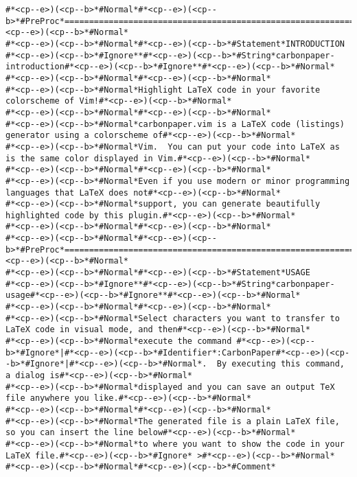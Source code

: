 \begin{lstlisting}[style=carbonpaper]
#*<cp--e>)(<cp--b>*#Normal*#*<cp--e>)(<cp--b>*#PreProc*==============================================================================#*<cp--e>)(<cp--b>*#Normal*
#*<cp--e>)(<cp--b>*#Normal*#*<cp--e>)(<cp--b>*#Statement*INTRODUCTION                                        #*<cp--e>)(<cp--b>*#Ignore**#*<cp--e>)(<cp--b>*#String*carbonpaper-introduction#*<cp--e>)(<cp--b>*#Ignore**#*<cp--e>)(<cp--b>*#Normal*
#*<cp--e>)(<cp--b>*#Normal*#*<cp--e>)(<cp--b>*#Normal*
#*<cp--e>)(<cp--b>*#Normal*Highlight LaTeX code in your favorite colorscheme of Vim!#*<cp--e>)(<cp--b>*#Normal*
#*<cp--e>)(<cp--b>*#Normal*#*<cp--e>)(<cp--b>*#Normal*
#*<cp--e>)(<cp--b>*#Normal*carbonpaper.vim is a LaTeX code (listings) generator using a colorscheme of#*<cp--e>)(<cp--b>*#Normal*
#*<cp--e>)(<cp--b>*#Normal*Vim.  You can put your code into LaTeX as is the same color displayed in Vim.#*<cp--e>)(<cp--b>*#Normal*
#*<cp--e>)(<cp--b>*#Normal*#*<cp--e>)(<cp--b>*#Normal*
#*<cp--e>)(<cp--b>*#Normal*Even if you use modern or minor programming languages that LaTeX does not#*<cp--e>)(<cp--b>*#Normal*
#*<cp--e>)(<cp--b>*#Normal*support, you can generate beautifully highlighted code by this plugin.#*<cp--e>)(<cp--b>*#Normal*
#*<cp--e>)(<cp--b>*#Normal*#*<cp--e>)(<cp--b>*#Normal*
#*<cp--e>)(<cp--b>*#Normal*#*<cp--e>)(<cp--b>*#PreProc*==============================================================================#*<cp--e>)(<cp--b>*#Normal*
#*<cp--e>)(<cp--b>*#Normal*#*<cp--e>)(<cp--b>*#Statement*USAGE                                                      #*<cp--e>)(<cp--b>*#Ignore**#*<cp--e>)(<cp--b>*#String*carbonpaper-usage#*<cp--e>)(<cp--b>*#Ignore**#*<cp--e>)(<cp--b>*#Normal*
#*<cp--e>)(<cp--b>*#Normal*#*<cp--e>)(<cp--b>*#Normal*
#*<cp--e>)(<cp--b>*#Normal*Select characters you want to transfer to LaTeX code in visual mode, and then#*<cp--e>)(<cp--b>*#Normal*
#*<cp--e>)(<cp--b>*#Normal*execute the command #*<cp--e>)(<cp--b>*#Ignore*|#*<cp--e>)(<cp--b>*#Identifier*:CarbonPaper#*<cp--e>)(<cp--b>*#Ignore*|#*<cp--e>)(<cp--b>*#Normal*.  By executing this command, a dialog is#*<cp--e>)(<cp--b>*#Normal*
#*<cp--e>)(<cp--b>*#Normal*displayed and you can save an output TeX file anywhere you like.#*<cp--e>)(<cp--b>*#Normal*
#*<cp--e>)(<cp--b>*#Normal*#*<cp--e>)(<cp--b>*#Normal*
#*<cp--e>)(<cp--b>*#Normal*The generated file is a plain LaTeX file, so you can insert the line below#*<cp--e>)(<cp--b>*#Normal*
#*<cp--e>)(<cp--b>*#Normal*to where you want to show the code in your LaTeX file.#*<cp--e>)(<cp--b>*#Ignore* >#*<cp--e>)(<cp--b>*#Normal*
#*<cp--e>)(<cp--b>*#Normal*#*<cp--e>)(<cp--b>*#Comment*    

\end{lstlisting}
